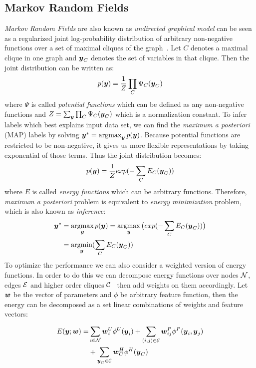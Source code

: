 \subsection{Markov Random Fields}
\label{sec:MRF}
\emph{Markov Random Fields} are also known as \emph{undirected
  graphical model} can be seen as a regularized joint
log-probability distribution of arbitrary non-negative functions
over a set of maximal cliques of the
graph~\cite{bishop:2006:PRML}. Let $C$ denotes a maximal clique
in one graph and ${\boldsymbol{y}}_C$ denotes the set of variables in that
clique. Then the joint distribution can be written as:
\begin{align}
  p({\boldsymbol{y}})=\frac{1}{Z}\prod_{C}{\Psi_C({\boldsymbol{y}}_C)}
\end{align}
\noindent where $\Psi$ is called \emph{potential functions} which
can be defined as any non-negative functions and
$Z=\sum_{{\boldsymbol{y}}}\prod_{C}{\Psi_C({\boldsymbol{y}}_C)}$ which is a normalization
constant. To infer labels which best explains input data set, we
can find the \emph{maximum a posteriori} (MAP) labels by solving
${\boldsymbol{y}}^*=\mathop{\textrm{argmax}}_{{\boldsymbol{y}}}p({\boldsymbol{y}})$. Because potential functions are
restricted to be non-negative, it gives us more flexible
representations by taking exponential of those terms. Thus the
joint distribution becomes:
\begin{align}
  p({\boldsymbol{y}})=\frac{1}{Z}exp(-\sum_{C}{E_C({\boldsymbol{y}}_C)})
\end{align}
\noindent where $E$ is called \emph{energy functions} which can be
arbitrary functions. Therefore, \emph{maximum a posteriori}
problem is equivalent to \emph{energy minimization} problem,
which is also known as \emph{inference}:
\begin{align}
  {\boldsymbol{y}}^*& =\mathop{\textrm{argmax}}_{{\boldsymbol{y}}}p({\boldsymbol{y}})=\mathop{\textrm{argmax}}_{{\boldsymbol{y}}}\big(exp(-\sum_{C}{E_C({\boldsymbol{y}}_C)})\big)\notag
  \\&=\mathop{\textrm{argmin}}_{{\boldsymbol{y}}}(\sum_{C}{E_C({\boldsymbol{y}}_C)})
\end{align}
To optimize the performance we can also consider a weighted
version of energy functions. In order to do this we can decompose
energy functions over nodes $\N$, edges $\E$ and higher order
cliques $\C$~\cite{Szummer:ECCV08} then add weights on them
accordingly. Let ${\boldsymbol{w}}$ be the vector of parameters and $\phi$ be
arbitrary feature function, then the energy can be decomposed as
a set linear combinations of weights and feature vectors:

\begin{align}
  \label{eq:energyfunction_UPH}
  E(\by;\bw)=&\sum_{i\in \N}{\bw_i^U\phi^U(\by_i)}+
               \sum_{(i,j)\in \E}{\bw_{ij}^P\phi^P(\by_i,\by_j)} \notag \\
               &+\sum_{\by_C\in \C}{\bw_C^H\phi^H(\by_C)}
\end{align}

